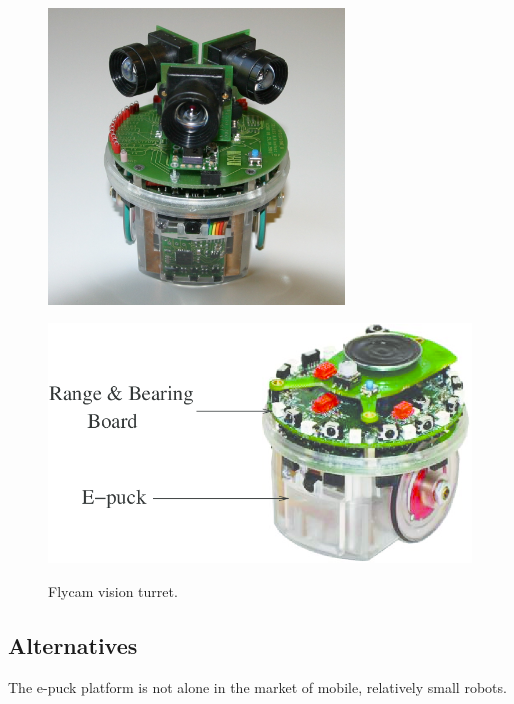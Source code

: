 \begin{figure}[!b]
	\centering
	\begin{minipage}{.5\textwidth}
		\centering
	\includegraphics[width=0.7\textwidth]{flycam}
	\caption{\label{fig:flycam}Flycam vision turret.}
	\end{minipage}%
	\begin{minipage}{.5\textwidth}
		\centering
		\includegraphics[width=1\linewidth]{randb}
		\label{fig:randb}
	\end{minipage}
\end{figure}


\clearpage

\subsection{Alternatives}
\label{alt}

The e-puck platform is not alone in the market of mobile, relatively small robots.

